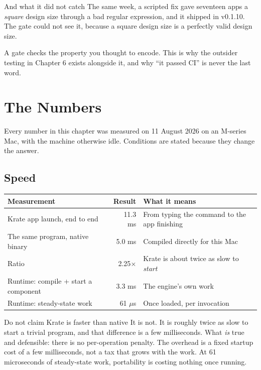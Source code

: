 \documentclass[11pt,a4paper]{report}
\begin{document}
\begin{warnbox}{And what it did not catch}
The same week, a scripted fix gave seventeen apps a \emph{square} design
size through a bad regular expression, and it shipped in v0.1.10. The gate
could not see it, because a square design size is a perfectly valid design
size.

A gate checks the property you thought to encode. This is why the outsider
testing in Chapter 6 exists alongside it, and why ``it passed CI'' is never
the last word.
\end{warnbox}

\chapter{The Numbers}

Every number in this chapter was measured on 11 August 2026 on an
M-series Mac, with the machine otherwise idle. Conditions are stated
because they change the answer.

\section{Speed}

\begin{center}
\begin{tabular}{lrp{6.6cm}}
\toprule
\textbf{Measurement} & \textbf{Result} & \textbf{What it means} \\
\midrule
Krate app launch, end to end & 11.3 ms & From typing the command to the app finishing \\
The same program, native binary & 5.0 ms & Compiled directly for this Mac \\
Ratio & 2.25$\times$ & Krate is about twice as slow to \emph{start} \\
\midrule
Runtime: compile + start a component & 3.3 ms & The engine's own work \\
Runtime: steady-state work & 61 $\mu$s & Once loaded, per invocation \\
\bottomrule
\end{tabular}
\end{center}

\begin{warnbox}{Do not claim Krate is faster than native}
It is not. It is roughly twice as slow to start a trivial program, and
that difference is a few milliseconds. What \emph{is} true and defensible:
there is no per-operation penalty. The overhead is a fixed startup cost of
a few milliseconds, not a tax that grows with the work. At 61 microseconds
of steady-state work, portability is costing nothing once running.
\end{warnbox}
\end{document}
